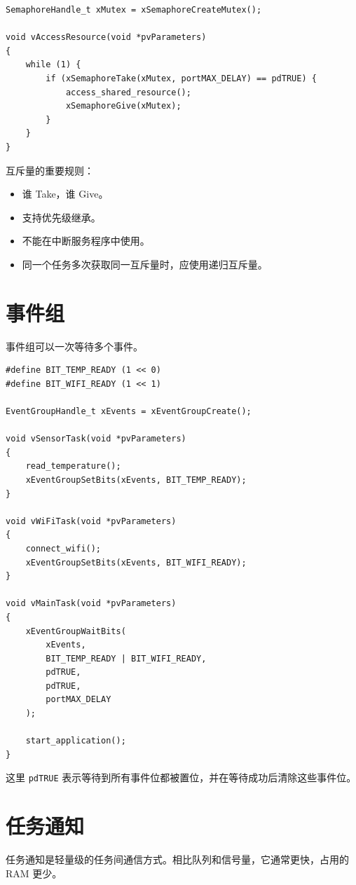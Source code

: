 \documentclass[12pt,a4paper]{ctexart}
\begin{document}
\begin{lstlisting}
SemaphoreHandle_t xMutex = xSemaphoreCreateMutex();

void vAccessResource(void *pvParameters)
{
    while (1) {
        if (xSemaphoreTake(xMutex, portMAX_DELAY) == pdTRUE) {
            access_shared_resource();
            xSemaphoreGive(xMutex);
        }
    }
}
\end{lstlisting}

互斥量的重要规则：

\begin{itemize}
    \item 谁 Take，谁 Give。
    \item 支持优先级继承。
    \item 不能在中断服务程序中使用。
    \item 同一个任务多次获取同一互斥量时，应使用递归互斥量。
\end{itemize}

\section{事件组}

事件组可以一次等待多个事件。

\begin{lstlisting}
#define BIT_TEMP_READY (1 << 0)
#define BIT_WIFI_READY (1 << 1)

EventGroupHandle_t xEvents = xEventGroupCreate();

void vSensorTask(void *pvParameters)
{
    read_temperature();
    xEventGroupSetBits(xEvents, BIT_TEMP_READY);
}

void vWiFiTask(void *pvParameters)
{
    connect_wifi();
    xEventGroupSetBits(xEvents, BIT_WIFI_READY);
}

void vMainTask(void *pvParameters)
{
    xEventGroupWaitBits(
        xEvents,
        BIT_TEMP_READY | BIT_WIFI_READY,
        pdTRUE,
        pdTRUE,
        portMAX_DELAY
    );

    start_application();
}
\end{lstlisting}

这里 \texttt{pdTRUE} 表示等待到所有事件位都被置位，并在等待成功后清除这些事件位。

\section{任务通知}

任务通知是轻量级的任务间通信方式。相比队列和信号量，它通常更快，占用的 RAM 更少。
\end{document}
